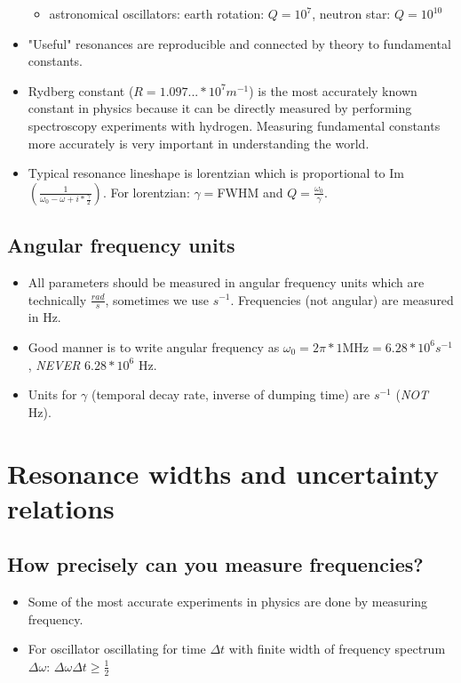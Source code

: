 \begin{itemize}
\begin{itemize}
							\item astronomical oscillators: earth rotation: $Q = 10^7$, neutron star: $Q = 10^{10}$
						\end{itemize}
					\item "Useful" resonances are reproducible and connected by theory to fundamental constants.
					\item Rydberg constant ($R = 1.097... * 10^7 m^{-1}$) is the most accurately known constant in physics because it can be directly measured by performing spectroscopy experiments with hydrogen. Measuring fundamental constants more accurately is very important in understanding the world.
					\item Typical resonance lineshape is lorentzian which is proportional to Im$\left(\frac{1}{\omega_0-\omega+i*\frac{\gamma}{2}}\right)$. For lorentzian: $\gamma = $FWHM and $Q = \frac{\omega_0}{\gamma}$.
				\end{itemize}
				
	\subsection{Angular frequency units}
		\begin{itemize}
			\item All parameters should be measured in angular frequency units which are technically $\frac{rad}{s}$, sometimes we use $s^{-1}$. Frequencies (not angular) are measured in Hz.
			\item Good manner is to write angular frequency as $\omega_0 = 2\pi*1\text{MHz} = 6.28 * 10^6 s^{-1}$, \emph{NEVER} $6.28 * 10^{6}$ Hz.
			\item Units for $\gamma$ (temporal decay rate, inverse of dumping time) are $s^{-1}$ (\emph{NOT} Hz).
		\end{itemize}
		
\section{Resonance widths and uncertainty relations}
	\subsection{How precisely can you measure frequencies?}
		\begin{itemize}
			\item Some of the most accurate experiments in physics are done by measuring frequency.
			\item For oscillator oscillating for time $\Delta t$ with finite width of frequency spectrum $\Delta\omega$: $\Delta\omega\Delta t \geq \frac{1}{2}$
		\end{itemize}

